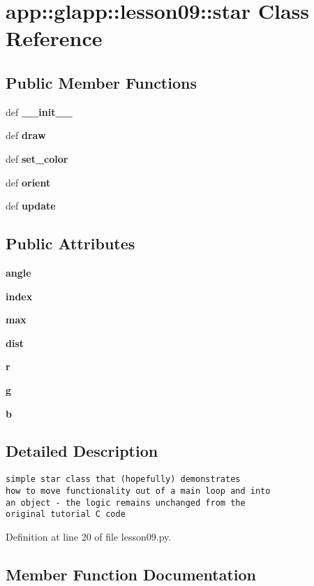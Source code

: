 \section{app::glapp::lesson09::star Class Reference}
\label{classapp_1_1glapp_1_1lesson09_1_1star}
\subsection*{Public Member Functions}
\begin{CompactItemize}
\item 
def {\bf \_\-\_\-init\_\-\_\-}
\item 
def {\bf draw}
\item 
def {\bf set\_\-color}
\item 
def {\bf orient}
\item 
def {\bf update}
\end{CompactItemize}
\subsection*{Public Attributes}
\begin{CompactItemize}
\item 
{\bf angle}
\item 
{\bf index}
\item 
{\bf max}
\item 
{\bf dist}
\item 
{\bf r}
\item 
{\bf g}
\item 
{\bf b}
\end{CompactItemize}


\subsection{Detailed Description}


\footnotesize\begin{verbatim}simple star class that (hopefully) demonstrates
how to move functionality out of a main loop and into
an object - the logic remains unchanged from the
original tutorial C code\end{verbatim}
\normalsize
 

Definition at line 20 of file lesson09.py.

\subsection{Member Function Documentation}
